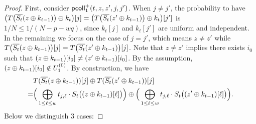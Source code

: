 \documentclass[journal=tosc,final,nohyperref]{iacrtrans}
\begin{document}
\begin{proof}
	First, consider $\mathsf{pcoll}_{1}^+(t,z,z',j,j')$. When $j\neq j'$, the probability to have
	$\big(T\big(\overline{S_t}(z\oplus k_{t-1})\big)\oplus k_t\big)[j]=\big(T\big(\overline{S_t}(z'\oplus k_{t-1})\big)\oplus k_t\big)[j']$ is $1/N\leq 1/(N-p-wq)$, since $k_t[j]$ and $k_t[j']$ are uniform and independent. In the remaining we focus on the case of $j=j'$, which means $z\neq z'$ while $T\big(\overline{S_t}(z\oplus k_{t-1})\big)[j]=T\big(\overline{S_t}(z'\oplus k_{t-1})\big)[j]$. Note that $z\neq z'$ implies there exists $i_0$ such that $(z\oplus k_{t-1})[i_0]\neq(z'\oplus k_{t-1})[i_0]$. By the assumption, $(z\oplus k_{t-1})[i_0]\notin U_1^{(0)}$. By construction, we have
	\begin{align*}
	&  T(\overline{S_t}(z\oplus k_{t-1}))[j]\oplus T(\overline{S_t}(z'\oplus k_{t-1}))[j]       \\
	= &
	\Big(\bigoplus_{1\leq\ell\leq w}t_{j,\ell}\cdot S_t\big((z\oplus k_{t-1})[\ell]\big)\Big)\oplus
	\Big(\bigoplus_{1\leq\ell\leq w}t_{j,\ell}\cdot S_t\big((z'\oplus k_{t-1})[\ell]\big)\Big)   .
	\end{align*}
	Below we distinguish 3 cases:
	

\end{proof}
\end{document}
